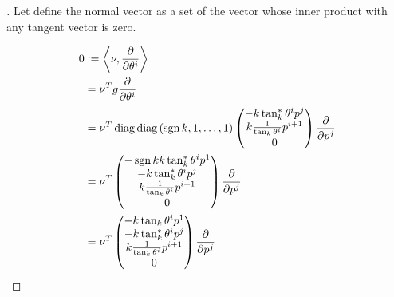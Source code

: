 \documentclass[../main.tex]{subfiles}
\begin{document}
\begin{proof}[]
    Let define the normal vector as a set of the vector whose inner product with any tangent vector is zero.

    \begin{align*}
        0
         & \defeq \inner{\nu}{\frac{\partial}{\partial \tensor{\theta}{^i}}}     \\
         & = \nu^T g \frac{\partial}{\partial \tensor{\theta}{^i}}          \\
         & = \nu^T \diag\diag{\left(\sign{k},1,\dots,1\right)}
        \begin{pmatrix}
            -k\tan_k^\ast\tensor{\theta}{^i}\tensor{p}{^j}         \\
            k\frac{1}{\tan_k\tensor{\theta}{^i}}\tensor{p}{^{i+1}} \\
            0                                                      \\
        \end{pmatrix}
        \frac{\partial}{\partial \tensor{p}{^j}}                            \\
         & = \nu^T
        \begin{pmatrix}
            -\sign{k}k\tan_k^\ast\tensor{\theta}{^i}\tensor{p}{^1}           \\
            -k\tan_k^\ast\tensor{\theta}{^i}\tensor{p}{^j}           \\
            k\frac{1}{\tan_k\tensor{\theta}{^i}}\tensor{p}{^{i+1}} \\
            0                                                                                              \\
        \end{pmatrix}
        \frac{\partial}{\partial \tensor{p}{^j}}                            \\
        & = \nu^T
        \begin{pmatrix}
            -k\tan_k\tensor{\theta}{^i}\tensor{p}{^1}           \\
            -k\tan_k^\ast\tensor{\theta}{^i}\tensor{p}{^j}           \\
           k\frac{1}{\tan_k\tensor{\theta}{^i}}\tensor{p}{^{i+1}} \\
           0                                                                                              \\
       \end{pmatrix}
       \frac{\partial}{\partial \tensor{p}{^j}}                            \\

\end{align*}
\end{proof}
\end{document}
